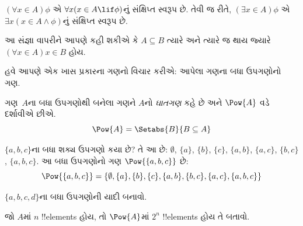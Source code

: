 \documentclass[../../../include/open-logic-section]{subfiles}
\begin{document}
\begin{defn}
$(\forall x \in A)\phi$ એ $\forall x(x \in A \lif
\phi)$નું સંક્ષિપ્ત સ્વરૂપ છે. તેવી જ રીતે, $(\exists x \in A)\phi$
એ $\exists x(x \in A \land \phi)$નું સંક્ષિપ્ત સ્વરૂપ છે.
\end{defn}

આ સંજ્ઞા વાપરીને આપણે કહી શકીએ કે $A \subseteq B$ ત્યારે અને ત્યારે જ
થાય જ્યારે $(\forall x \in A)x \in B$ હોય.

હવે આપણે એક ખાસ પ્રકારના ગણનો વિચાર કરીએ: આપેલા ગણના બધા ઉપગણોનો ગણ.

\begin{defn}[ઘાતગણ]
ગણ~$A$ના બધા ઉપગણોથી બનેલા ગણને $A$નો \emph{ઘાતગણ} કહે છે
અને $\Pow{A}$ વડે દર્શાવીએ છીએ.
  \[
    \Pow{A} = \Setabs{B}{B \subseteq A}
  \]
\end{defn}

\begin{ex}
$\{ a, b, c \}$ના બધા શક્ય ઉપગણો કયા છે? તે આ છે:
$\emptyset$, $\{a \}$, $\{b\}$, $\{c\}$, $\{a, b\}$, $\{a, c\}$, $\{b,
c\}$, $\{a, b, c\}$. આ બધા ઉપગણોનો ગણ $\Pow{\{a,b,c\}}$ છે:
\[
\Pow{\{ a, b, c \}} = \{\emptyset, \{a \}, \{b\}, \{c\}, \{a, b\},
\{b, c\}, \{a, c\}, \{a, b, c\}\}
\]
\end{ex}

\begin{prob}
$\{a, b, c, d\}$ના બધા ઉપગણોની યાદી બનાવો.
\end{prob}

\begin{prob}
જો $A$માં $n$ !!{element}s હોય, તો $\Pow{A}$માં $2^n$
!!{element}s હોય તે બતાવો.
\end{prob}
\end{document}
